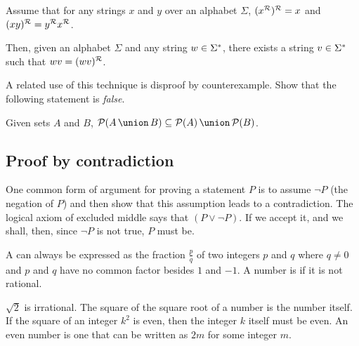 \begin{stmt1}
Assume that for any strings $x$ and $y$ over an alphabet $\Sigma$, $(x^{\mathcal{R}})^{\mathcal{R}} = x$ and $(xy)^{\mathcal{R}} = y^{\mathcal{R}}x^{\mathcal{R}}$.

Then, given an alphabet $\Sigma$ and any string $w \in \Sigma^{*}$, there exists a string $v \in \Sigma^{*}$ such that $wv = (wv)^{\mathcal{R}}$.
\end{stmt1}

\begin{discussion}
A related use of this technique is disproof by counterexample. Show that the following statement is \emph{false}.
\end{discussion}

\begin{stmt1}
Given sets $A$ and $B$, $\powerset{\setunion{A}{B}} \subseteq \setunion{\powerset{A}}{\powerset{B}}$.
\end{stmt1}

\subsection{Proof by contradiction}

\begin{discussion}
One common form of argument for proving a statement $P$ is to assume $\lnot P$ (the negation of $P$) and then show that this assumption leads to a contradiction. The logical axiom of excluded middle says that $(P \lor \lnot P)$. If we accept it, and we shall, then, since $\lnot P$ is not true, $P$ must be.
\end{discussion}

\begin{defn}
A  can always be expressed as the fraction $\frac p q$ of two integers $p$ and $q$ where $q \neq 0$ and $p$ and $q$ have no common factor besides $1$ and $-1$. A number is  if it is not rational.
\end{defn}

\begin{stmt2}
$\sqrt 2$ is irrational.
\hint The square of the square root of a number is the number itself.
\hint If the square  of an integer $k^2$ is even, then the integer $k$ itself must be even.
\hint An even number is one that can be written as $2m$ for some integer $m$.
\end{stmt2}

